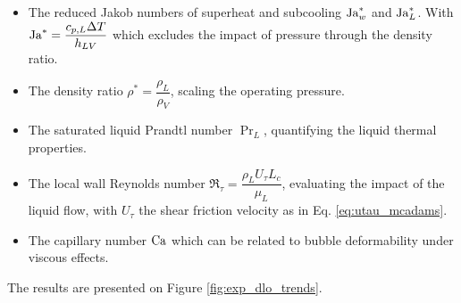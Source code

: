 \begin{itemize}
\item The reduced Jakob numbers of superheat and subcooling $\mathrm{Ja}_{w}^{*}$ and $\mathrm{Ja}_{L}^{*}$. With $\mathrm{Ja}^{*} = \dfrac{c_{p,L}\Delta T}{h_{LV}}$ which excludes the impact of pressure through the density ratio.

\item The density ratio $\rho^{*} = \dfrac{\rho_{L}}{\rho_{V}}$, scaling the operating pressure.

\item The saturated liquid Prandtl number $\Pr_{L}$, quantifying the liquid thermal properties.

\item The local wall Reynolds number $\Re_{\tau} = \dfrac{\rho_{L}U_{\tau}L_{c}}{\mu_{L}}$, evaluating the impact of the liquid flow, with $U_{\tau}$ the shear friction velocity as in Eq. \ref{eq:utau_mcadams}.

\item The capillary number $\mathrm{Ca}$ which can be related to bubble deformability under viscous effects.
\end{itemize}


The results are presented on Figure \ref{fig:exp_dlo_trends}.

